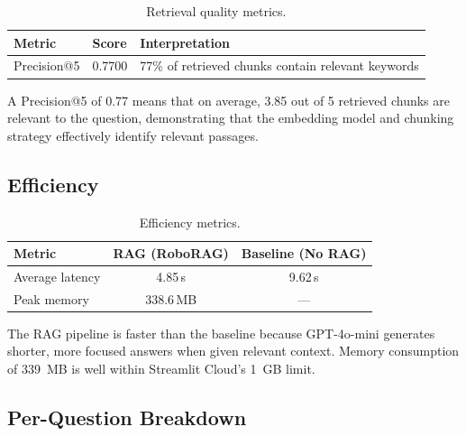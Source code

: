 \documentclass[12pt, a4paper]{article}
\begin{document}
\begin{table}[h]
\centering
\begin{tabular}{@{}lll@{}}
\toprule
\textbf{Metric} & \textbf{Score} & \textbf{Interpretation} \\
\midrule
Precision@5 & 0.7700 & 77\% of retrieved chunks contain relevant keywords \\
\bottomrule
\end{tabular}
\caption{Retrieval quality metrics.}
\end{table}

A Precision@5 of 0.77 means that on average, 3.85 out of 5 retrieved chunks are relevant to the question, demonstrating that the embedding model and chunking strategy effectively identify relevant passages.

\subsection{Efficiency}

\begin{table}[h]
\centering
\begin{tabular}{@{}lcc@{}}
\toprule
\textbf{Metric} & \textbf{RAG (RoboRAG)} & \textbf{Baseline (No RAG)} \\
\midrule
Average latency & 4.85\,s & 9.62\,s \\
Peak memory & 338.6\,MB & --- \\
\bottomrule
\end{tabular}
\caption{Efficiency metrics.}
\end{table}

The RAG pipeline is faster than the baseline because GPT-4o-mini generates shorter, more focused answers when given relevant context. Memory consumption of 339~MB is well within Streamlit Cloud's 1~GB limit.

\subsection{Per-Question Breakdown}
\end{document}
